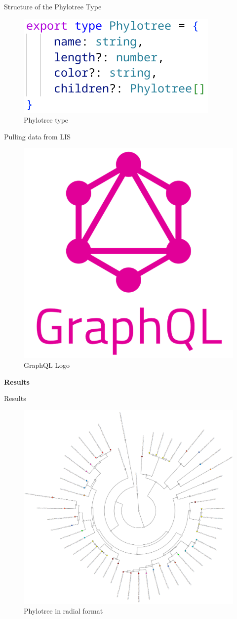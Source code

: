 \documentclass[aspectratio=169]{beamer}
\begin{document}
		\begin{frame}{Structure of the Phylotree Type}
			\begin{figure}
				\centering
				\includegraphics[width=0.7\linewidth]{imgs/phylotree-type.png}
				\caption{Phylotree type}
			\end{figure}
			\end{frame}
			\begin{frame}{Pulling data from LIS}
				\begin{figure}
					\centering
					\includegraphics[height=0.5\linewidth]{imgs/graphql-logo.png}
					\caption{GraphQL Logo}
				\end{figure}
			\end{frame}
		\begin{frame}
			\large{\textbf{Results}}
		\end{frame}
		\begin{frame}{Results}
			\begin{figure}
			    \centering
			    \includegraphics[width=0.55\linewidth]{imgs/radial-color.png}
			    \caption{Phylotree in radial format}
			\end{figure}
		\end{frame}
\end{document}
